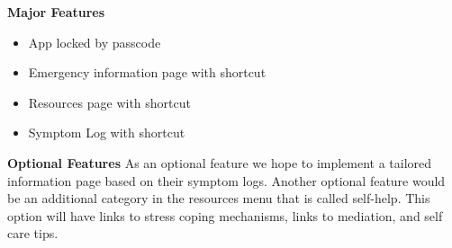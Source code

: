 \documentclass[letterpaper,12pt,titlepage]{article}
\begin{document}
\newline
\newline
\textbf{Major Features}
\begin{itemize}
  \item App locked by passcode
  \item Emergency information page with shortcut
  \item Resources page with shortcut
  \item Symptom Log with shortcut
\end{itemize}
\textbf{Optional Features}
\newline
\newline
As an optional feature we hope to implement a tailored information page based on their symptom logs. Another optional feature would be an additional category in the resources menu that is called self-help. This option will have links to stress coping mechanisms, links to mediation,  and self care tips.
\newpage
\end{document}

